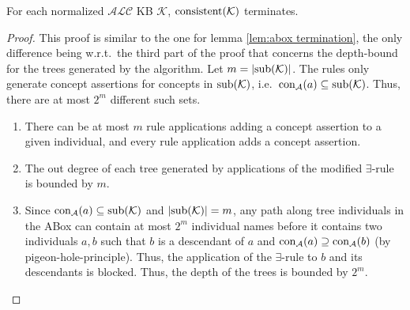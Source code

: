 \begin{lemma}[Termination]
	For each normalized $\mathcal{ALC}$ KB $\mathcal{K}$, $\operatorname{\text{consistent}}(\mathcal{K})$ terminates.
\end{lemma}
\begin{proof}
	This proof is similar to the one for lemma \ref{lem:abox termination},
	the only difference being w.r.t.\ the third part of the proof
	that concerns the depth-bound for the trees generated by the algorithm.
	Let $m = \lvert \operatorname{\text{sub}}(\mathcal{K}) \rvert$.
	The rules only generate concept assertions for concepts in $\operatorname{\text{sub}}(\mathcal{K})$,
	i.e.\ $\operatorname{\text{con}}_{\mathcal{A}}(a) \subseteq \operatorname{\text{sub}}(\mathcal{K})$.
	Thus, there are at most $2^m$ different such sets.
	\begin{enumerate}
		\item There can be at most $m$ rule applications adding a concept assertion to a given individual,
			and every rule application adds a concept assertion.
		\item The out degree of each tree generated by applications of the modified $\exists$-rule is bounded by $m$.
		\item Since $\operatorname{\text{con}}_{\mathcal{A}}(a) \subseteq \operatorname{\text{sub}}(\mathcal{K})$ and $\lvert \operatorname{\text{sub}}(\mathcal{K}) \rvert = m$,
			any path along tree individuals in the ABox can contain at most $2^m$ individual names
			before it contains two individuals $a, b$ such that $b$ is a descendant of $a$ and
			$\operatorname{\text{con}}_{\mathcal{A}}(a) \supseteq \operatorname{\text{con}}_{\mathcal{A}}(b)$ (by pigeon-hole-principle).
			Thus, the application of the $\exists$-rule to $b$ and its descendants is blocked.
			Thus, the depth of the trees is bounded by $2^m$.
			\qedhere
	\end{enumerate}
\end{proof}

